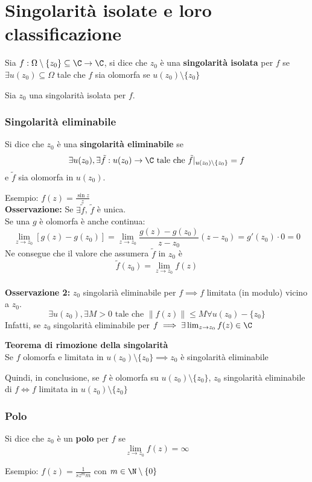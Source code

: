 
\section{Singolarità isolate e loro classificazione}	
\begin{tcolorbox}
	Sia $f:\Omega \setminus \{z_0\} \subseteq\C\to \C$, si dice che $z_0$ è una \textbf{singolarità isolata} per $f$ se $\exists u(z_0)\subseteq\Omega$ tale che $f$ sia olomorfa se $u(z_0)\setminus \{z_0\}$  
\end{tcolorbox}
Sia $z_0$ una singolarità isolata per $f$.
\subsubsection{Singolarità eliminabile}
\begin{tcolorbox}
Si dice che $z_0$ è una \textbf{singolarità eliminabile} se 
\[\exists u(z_0),\exists\tilde f:u(z_0)\to \C \text{ tale che }\tilde f|_{u(z_0)\setminus \{z_0\} }=f\]
e $\tilde f$ sia olomorfa in $u(z_0)$.
\end{tcolorbox}
Esempio: $f(z)= \frac{\sin z}{z}$
\\\textbf{Osservazione:} Se $\exists \tilde f$, $\tilde f$ è unica.
\\Se una $g$ è olomorfa è anche continua:
\[\lim_{z \to z_0} [g(z)-g(z_0)]=\lim_{z \to z_0} \frac{g(z)-g(z_0)}{z-z_0}(z-z_0)=g'(z_0)\cdot 0=0\]
Ne consegue che il valore che assumera $\tilde f$ in $z_0$ è 
\[\tilde f(z_0)=\lim_{z \to z_0} f(z)\]\\
\textbf{Osservazione 2:} $z_0$ singolarià eliminabile per $f\implies f$ limitata (in modulo) vicino a $z_0$.
\[\exists u(z_0), \exists M>0 \text{ tale che } \|f(z)\|\le M\forall u(z_0)-\{z_0\} \]
Infatti, se $z_0$ singolarità eliminabile per $f\implies \exists \lim_{z \to z_0} f(z)\in\C$
\begin{tcolorbox}
	\textbf{Teorema di rimozione della singolarità} 
	\\Se $f$ olomorfa e limitata in $u(z_0)\setminus \{z_0\} \implies z_0$ è singolarità eliminabile
\end{tcolorbox}
Quindi, in conclusione, se $f$ è olomorfa su $u(z_0)\setminus \{z_0\} $, $z_0$ singolarità eliminabile di $f \iff f$ limitata in $u(z_0)\setminus \{z_0\} $ 
\subsubsection{Polo}
\begin{tcolorbox}
	Si dice che $z_0$ è un \textbf{polo} per $f$ se 
	\[\lim_{z \to z_0} f(z)=\infty\]
\end{tcolorbox}
Esempio: $f(z)=\frac{1}{sz^mm}$ con $m\in \N\setminus \{0\} $
